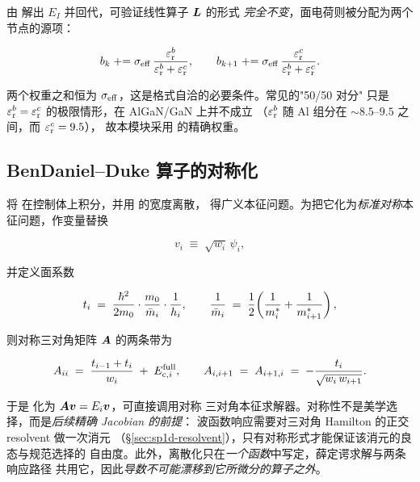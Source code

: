 由  解出 $E_I$ 并回代，可验证线性算子 $\bm{L}$ 的形式
\emph{完全不变}，面电荷则被分配为两个节点的源项：

\begin{equation}
b_k \mathrel{+}= \sigma_{\mathrm{eff}}\,\frac{\varepsilon_{\mathrm{r}}^{b}}{\varepsilon_{\mathrm{r}}^{b}+\varepsilon_{\mathrm{r}}^{c}},
\qquad
b_{k+1} \mathrel{+}= \sigma_{\mathrm{eff}}\,\frac{\varepsilon_{\mathrm{r}}^{c}}{\varepsilon_{\mathrm{r}}^{b}+\varepsilon_{\mathrm{r}}^{c}} .
\label{eq:sheet-split}
\end{equation}

两个权重之和恒为 $\sigma_{\mathrm{eff}}$，这是格式自洽的必要条件。常见的"50/50 对分"
只是 $\varepsilon_{\mathrm{r}}^{b}=\varepsilon_{\mathrm{r}}^{c}$ 的极限情形，在 AlGaN/GaN 上并不成立
（$\varepsilon_{\mathrm{r}}^{b}$ 随 Al 组分在 $\sim8.5$–$9.5$ 之间，而 $\varepsilon_{\mathrm{r}}^{c}=9.5$），
故本模块采用  的精确权重。

\subsection{BenDaniel--Duke 算子的对称化}
\label{sec:sp1d-bdd}

将  在控制体上积分，并用  的宽度离散，
得广义本征问题。为把它化为\emph{标准对称}本征问题，作变量替换

\begin{equation}
v_i \;\equiv\; \sqrt{w_i}\,\psi_i ,
\label{eq:symmetrise}
\end{equation}

并定义面系数

\begin{equation}
t_i \;=\; \frac{\hbar^{2}}{2m_{0}}\cdot\frac{m_{0}}{\bar m_i}\cdot\frac{1}{h_i},
\qquad
\frac{1}{\bar m_i} \;=\; \frac12\!\left(\frac{1}{m^{*}_i}+\frac{1}{m^{*}_{i+1}}\right),
\label{eq:t-coeff}
\end{equation}

则对称三对角矩阵 $\bm{A}$ 的两条带为

\begin{equation}
A_{ii} \;=\; \frac{t_{i-1}+t_i}{w_i} \;+\; E_{\mathrm{c},i}^{\mathrm{full}},
\qquad
A_{i,i+1} \;=\; A_{i+1,i} \;=\; -\frac{t_i}{\sqrt{w_i\,w_{i+1}}} .
\label{eq:A-bands}
\end{equation}

于是  化为 $\bm{A}\bm{v}=E_{i}\bm{v}$，可直接调用对称
三对角本征求解器。对称性不是美学选择，而是\emph{后续精确 Jacobian 的前提}：
波函数响应需要对三对角 Hamilton 的正交 resolvent 做一次消元
（\S\ref{sec:sp1d-resolvent}），只有对称形式才能保证该消元的良态与规范选择的
自由度。此外，离散化只在\emph{一个函数}中写定，薛定谔求解与两条响应路径
共用它，因此\emph{导数不可能漂移到它所微分的算子之外}。

